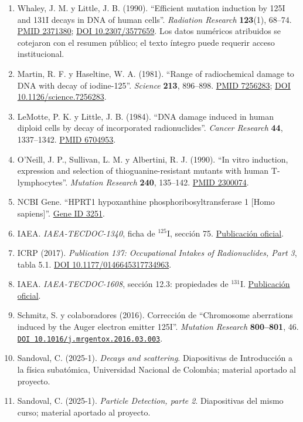 \documentclass[11pt,a4paper,oneside]{article}
\providecommand{\tightlist}{\setlength{\itemsep}{0pt}\setlength{\parskip}{0pt}}
\begin{document}
\begin{enumerate}
\def\labelenumi{\arabic{enumi}.}
\tightlist
\item
  Whaley, J. M. y Little, J. B. (1990). ``Efficient mutation induction by 125I and 131I decays in DNA of human cells''. \emph{Radiation Research} \textbf{123}(1), 68--74. \href{https://pubmed.ncbi.nlm.nih.gov/2371380/}{PMID 2371380}; \href{https://doi.org/10.2307/3577659}{DOI 10.2307/3577659}. Los datos numéricos atribuidos se cotejaron con el resumen público; el texto íntegro puede requerir acceso institucional.
\item
  Martin, R. F. y Haseltine, W. A. (1981). ``Range of radiochemical damage to DNA with decay of iodine-125''. \emph{Science} \textbf{213}, 896--898. \href{https://pubmed.ncbi.nlm.nih.gov/7256283/}{PMID 7256283}; \href{https://doi.org/10.1126/science.7256283}{DOI 10.1126/science.7256283}.
\item
  LeMotte, P. K. y Little, J. B. (1984). ``DNA damage induced in human diploid cells by decay of incorporated radionuclides''. \emph{Cancer Research} \textbf{44}, 1337--1342. \href{https://pubmed.ncbi.nlm.nih.gov/6704953/}{PMID 6704953}.
\item
  O'Neill, J. P., Sullivan, L. M. y Albertini, R. J. (1990). ``In vitro induction, expression and selection of thioguanine-resistant mutants with human T-lymphocytes''. \emph{Mutation Research} \textbf{240}, 135--142. \href{https://pubmed.ncbi.nlm.nih.gov/2300074/}{PMID 2300074}.
\item
  NCBI Gene. ``HPRT1 hypoxanthine phosphoribosyltransferase 1 {[}Homo sapiens{]}''. \href{https://www.ncbi.nlm.nih.gov/gene/3251}{Gene ID 3251}.
\item
  IAEA. \emph{IAEA-TECDOC-1340}, ficha de \(^{125}\mathrm{I}\), sección 75. \href{https://www-pub.iaea.org/MTCD/publications/PDF/te_1340_web.pdf}{Publicación oficial}.
\item
  ICRP (2017). \emph{Publication 137: Occupational Intakes of Radionuclides, Part 3}, tabla 5.1. \href{https://doi.org/10.1177/0146645317734963}{DOI 10.1177/0146645317734963}.
\item
  IAEA. \emph{IAEA-TECDOC-1608}, sección 12.3: propiedades de \(^{131}\mathrm{I}\). \href{https://www-pub.iaea.org/MTCD/Publications/PDF/te_1608_web.pdf}{Publicación oficial}.
\item
  Schmitz, S. y colaboradores (2016). Corrección de ``Chromosome aberrations induced by the Auger electron emitter 125I''. \emph{Mutation Research} \textbf{800--801}, 46. \href{https://doi.org/10.1016/j.mrgentox.2016.03.003}{\nolinkurl{DOI 10.1016/j.mrgentox.2016.03.003}}.
\item
  Sandoval, C. (2025-1). \emph{Decays and scattering}. Diapositivas de Introducción a la física subatómica, Universidad Nacional de Colombia; material aportado al proyecto.
\item
  Sandoval, C. (2025-1). \emph{Particle Detection, parte 2}. Diapositivas del mismo curso; material aportado al proyecto.


\end{enumerate}
\end{document}
